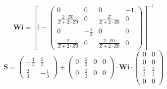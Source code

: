 \[ \mathbf{Wi} =  \left[ \mathbb{I}  - \left(\begin{array}{cccc} 0 & 0
& 0 & -1 \\ \frac{2\cdot Z0}{Z+2\cdot Z0} & 0 & \frac{Z}{Z+2\cdot Z0}
& 0 \\ 0 & -\frac{1}{3} & 0 & 0 \\ \frac{Z}{Z+2\cdot Z0} & 0 &
\frac{2\cdot Z0}{Z+2\cdot Z0} & 0 \end{array}\right) \right]^{-1}  \]
\[ \mathbf{S} = \left(\begin{array}{cc} -\frac{1}{3} & \frac{2}{3} \\
\frac{2}{3} & -\frac{1}{3} \end{array}\right) +
\left(\begin{array}{cccc} 0 & \frac{2}{3} & 0 & 0 \\ 0 & \frac{2}{3} &
0 & 0 \end{array}\right) \cdot \mathbf{Wi}
\cdot\left(\begin{array}{cc} 0 & 0 \\ 0 & 0 \\ \frac{2}{3} &
\frac{2}{3} \\ 0 & 0 \end{array}\right) \]
